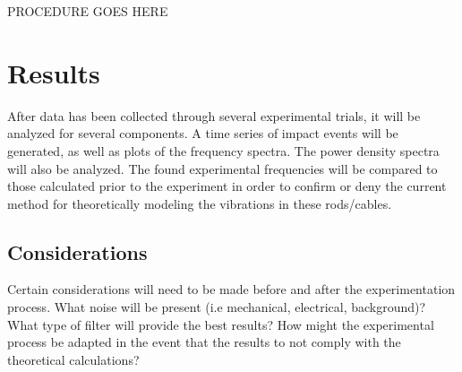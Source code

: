 \documentclass[10pt,letterpaper,titlepage]{article}
\begin{document}
PROCEDURE GOES HERE

\section{Results}

After data has been collected through several experimental trials, it will be analyzed for several components. A time series of impact events will be generated, as well as plots of the frequency spectra. The power density spectra will also be analyzed. The found experimental frequencies will be compared to those calculated prior to the experiment in order to confirm or deny the current method for theoretically modeling the vibrations in these rods/cables. 

\subsection{Considerations}

Certain considerations will need to be made before and after the experimentation process. What noise will be present (i.e mechanical, electrical, background)? What type of filter will provide the best results? How might the experimental process be adapted in the event that the results to not comply with the theoretical calculations?

% 
% 
% 
% 



% 
% 




\end{document}
